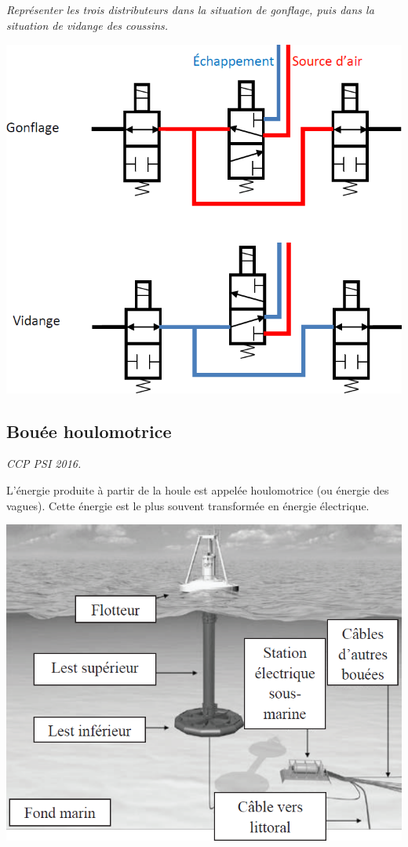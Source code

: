 \documentclass[10pt,fleqn]{article} %
\begin{document}
\begin{multicols}{2}
\fi
\subparagraph{}\textit{Représenter les trois distributeurs dans la situation de gonflage, puis dans la situation de vidange des coussins.
}
\ifprof
\begin{corrige}
\begin{center}
\includegraphics[width=.5\linewidth]{images/cor_02}
\end{center}
\end{corrige}
\else
\fi


\subsection*{Bouée houlomotrice}
\setcounter{exo}{0}
\begin{flushright}
\textit{CCP PSI 2016.}
\end{flushright}


\ifprof
\else
L’énergie produite à partir de la houle est appelée houlomotrice (ou énergie des vagues). Cette énergie est le plus souvent
transformée en énergie électrique.

\begin{center}
\includegraphics[width=\linewidth]{images/fig_09}
\end{center}


\end{multicols}
\end{document}
